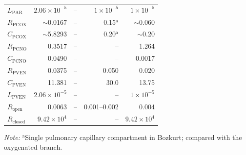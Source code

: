 \documentclass{article}
\begin{document}
\begin{table}[H]
\begin{tabular}{lrrrr}
$L_{\mathrm{PAR}}$ & $2.06\times10^{-5}$ & -- & $1\times10^{-5}$ & $1\times10^{-5}$ \\
$R_{\mathrm{PCOX}}$ & $\sim$0.0167 & -- & 0.15$^{\mathrm{a}}$ & $\sim$0.060 \\
$C_{\mathrm{PCOX}}$ & $\sim$5.8293 & -- & 0.20$^{\mathrm{a}}$ & $\sim$0.20 \\
$R_{\mathrm{PCNO}}$ & 0.3517 & -- & -- & 1.264 \\
$C_{\mathrm{PCNO}}$ & 0.0490 & -- & -- & 0.0017 \\
$R_{\mathrm{PVEN}}$ & 0.0375 & -- & 0.050 & 0.020 \\
$C_{\mathrm{PVEN}}$ & 11.381 & -- & 30.0 & 13.75 \\
$L_{\mathrm{PVEN}}$ & $2.06\times10^{-5}$ & -- & -- & $1\times10^{-5}$ \\
$R_{\mathrm{open}}$ & 0.0063 & -- & 0.001--0.002 & 0.004 \\
$R_{\mathrm{closed}}$ & $9.42\times10^{4}$ & -- & -- & $9.42\times10^{4}$ \\
\bottomrule
\end{tabular}
\par\vspace{2pt}
{\footnotesize \emph{Note:} $^{\mathrm{a}}$Single pulmonary capillary compartment in Bozkurt; compared with the oxygenated branch.}
\end{table}
\end{document}
